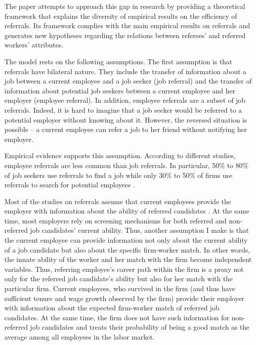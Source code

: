 \documentclass[12pt]{article}
\begin{document}
The paper attempts to approach this gap in research by providing a theoretical framework that explains the diversity of empirical results on the efficiency of referrals. Its framework complies with the main empirical results on referrals and generates new hypotheses regarding the relations between referees' and referred workers' attributes.

The model rests on the following assumptions. The first assumption is that referrals have bilateral nature. They include the transfer of information about a job between a current employee and a job seeker (job referral) and the transfer of information about potential job seekers between a current employee and her employer (employee referral). In addition, employee referrals are a subset of job referrals. Indeed, it is hard to imagine that a job seeker would be referred to a potential employer without knowing about it. However, the reversed situation is possible – a current employee can refer a job to her friend without notifying her employer. 

Empirical evidence supports this assumption. According to different studies, employee referrals are less common than job referrals. In particular,  50\% to 80\% of job seekers use referrals to find a job  \citep{lin1981social, elliott1999social} while only 30\% to 50\% of firms use referrals to search for potential employees \citep{neckerman1991hiring, holzer1987hiring}.

Most of the studies on referrals assume that current employees provide the employer with information about the ability of referred candidates \citep{lester2021heterogeneous, ekinci2016employee, beaman2012gets}. At the same time, most employers rely on screening mechanisms for both referred and non-referred job candidates' current ability. Thus, another assumption I make is that the current employee can provide information not only about the current ability of a job candidate but also about the specific firm-worker match. In other words, the innate ability of the worker and her match with the firm become independent variables. Thus, referring employee’s career path within the firm is a proxy not only for the referred job candidate’s ability but also for her match with the particular firm. Current employees, who survived in the firm (and thus have sufficient tenure and wage growth observed by the firm) provide their employer with information about the expected firm-worker match of referred job candidates. At the same time, the firm does not have such information for non-referred job candidates and treats their probability of being a good match as the average among all employees in the labor market. 
\end{document}

